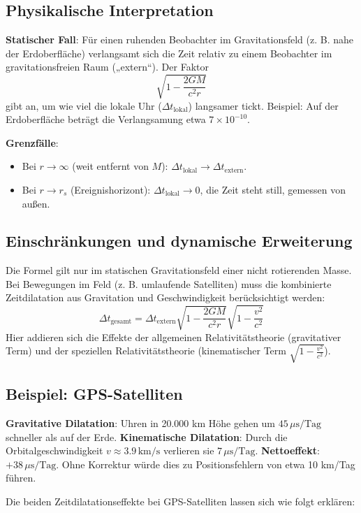 \documentclass[a4paper,12pt]{article}
\begin{document}
	\subsection{Physikalische Interpretation}
	\textbf{Statischer Fall}: Für einen ruhenden Beobachter im Gravitationsfeld (z. B. nahe der Erdoberfläche) verlangsamt sich die Zeit relativ zu einem Beobachter im gravitationsfreien Raum („extern“). Der Faktor
	\[
	\sqrt{1 - \frac{2 G M}{c^2 r}}
	\]
	gibt an, um wie viel die lokale Uhr (\( \Delta t_{\text{lokal}} \)) langsamer tickt. Beispiel: Auf der Erdoberfläche beträgt die Verlangsamung etwa \( 7 \times 10^{-10} \).
	
	\textbf{Grenzfälle}:
	\begin{itemize}
		\item Bei \( r \to \infty \) (weit entfernt von \( M \)): \( \Delta t_{\text{lokal}} \to \Delta t_{\text{extern}} \).
		\item Bei \( r \to r_s \) (Ereignishorizont): \( \Delta t_{\text{lokal}} \to 0 \), die Zeit steht still, gemessen von außen.
	\end{itemize}
	
	\subsection{Einschränkungen und dynamische Erweiterung}
	Die Formel gilt nur im statischen Gravitationsfeld einer nicht rotierenden Masse. Bei Bewegungen im Feld (z. B. umlaufende Satelliten) muss die kombinierte Zeitdilatation aus Gravitation und Geschwindigkeit berücksichtigt werden:
	\[
	\Delta t_{\text{gesamt}} = \Delta t_{\text{extern}} \sqrt{1 - \frac{2 G M}{c^2 r}} \sqrt{1 - \frac{v^2}{c^2}}
	\]
	Hier addieren sich die Effekte der allgemeinen Relativitätstheorie (gravitativer Term) und der speziellen Relativitätstheorie (kinematischer Term \( \sqrt{1 - \frac{v^2}{c^2}} \)).
	
	\subsection{Beispiel: GPS-Satelliten}
	\textbf{Gravitative Dilatation}: Uhren in 20.000 km Höhe gehen um \( 45 \, \mu\text{s/Tag} \) schneller als auf der Erde. \textbf{Kinematische Dilatation}: Durch die Orbitalgeschwindigkeit \( v \approx 3.9 \, \text{km/s} \) verlieren sie \( 7 \, \mu\text{s/Tag} \). \textbf{Nettoeffekt}: \( +38 \, \mu\text{s/Tag} \). Ohne Korrektur würde dies zu Positionsfehlern von etwa 10 km/Tag führen.
	
	Die beiden Zeitdilatationseffekte bei GPS-Satelliten lassen sich wie folgt erklären:
	
\end{document}
